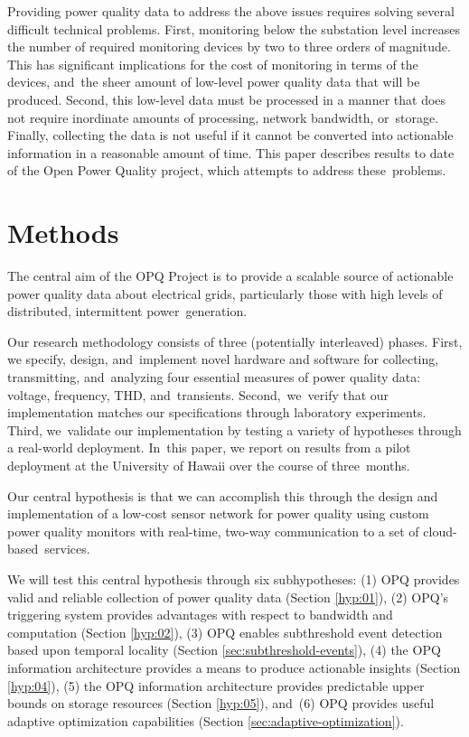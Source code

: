 \documentclass[energies,article,accept,moreauthors,pdftex]{Definitions/mdpi}
\begin{document}
Providing power quality data to address the above issues requires solving several difficult technical problems. First, monitoring below the substation level increases the number of required monitoring devices by two to three orders of magnitude. This has significant implications for the cost of monitoring in terms of the devices, and~the sheer amount of low-level power quality data that will be produced. Second, this low-level data must be processed in a manner that does not require inordinate amounts of processing, network bandwidth, or~storage. Finally, collecting the data is not useful if it cannot be converted into actionable information in a reasonable amount of time. This paper describes results to date of the Open Power Quality project, which attempts to address these~problems.

\section{Methods}

The central aim of the OPQ Project is to provide a scalable source of actionable power quality data about electrical grids, particularly those with high levels of distributed, intermittent power~generation.

Our research methodology consists of three (potentially interleaved) phases. First, we specify, design, and~implement novel hardware and software for collecting, transmitting, and~analyzing four essential measures of power quality data: voltage, frequency, THD, and~transients. Second,~we~verify that our implementation matches our specifications through laboratory experiments. Third, we~validate our implementation by testing a variety of hypotheses through a real-world deployment. In~this paper, we report on results from a pilot deployment at the University of Hawaii over the course of three~months.

Our central hypothesis is that we can accomplish this through the design and implementation of a low-cost sensor network for power quality using custom power quality monitors with real-time, two-way communication to a set of cloud-based~services.

We will test this central hypothesis through six subhypotheses: (1) OPQ provides valid and reliable collection of power quality data (Section \ref{hyp:01}), (2) OPQ's triggering system provides advantages with respect to bandwidth and computation (Section \ref{hyp:02}), (3) OPQ enables subthreshold event detection based upon temporal locality (Section \ref{sec:subthreshold-events}), (4) the OPQ information architecture provides a means to produce actionable insights (Section \ref{hyp:04}), (5) the OPQ information architecture provides predictable upper bounds on storage resources (Section \ref{hyp:05}), and~(6) OPQ provides useful adaptive optimization capabilities (Section \ref{sec:adaptive-optimization}).
\end{document}
